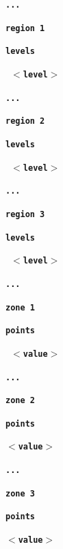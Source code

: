 \documentclass[12pt]{report}
\begin{document}
\textbf{\texttt{...}}

\textbf{\texttt{region 1}}

\textbf{\texttt{levels}}

\textbf{\texttt{ \begin{math}<\end{math}level\begin{math}>\end{math}}}


\textbf{\texttt{...}}

\textbf{\texttt{region 2}}

\textbf{\texttt{levels}}

\textbf{\texttt{ \begin{math}<\end{math}level\begin{math}>\end{math}}}

\textbf{\texttt{...}}

\textbf{\texttt{region 3}}

\textbf{\texttt{levels}}

\textbf{\texttt{ \begin{math}<\end{math}level\begin{math}>\end{math}}}

\textbf{\texttt{...}}

\textbf{\texttt{zone 1}}

\textbf{\texttt{points}}

\textbf{\texttt{ \begin{math}<\end{math}value\begin{math}>\end{math}}}

\textbf{\texttt{...}}

\textbf{\texttt{zone 2}}

\textbf{\texttt{points}}

\textbf{\texttt{\begin{math}<\end{math}value\begin{math}>\end{math}}}

\textbf{\texttt{...}}

\textbf{\texttt{zone 3}}

\textbf{\texttt{points}}

\textbf{\texttt{\begin{math}<\end{math}value\begin{math}>\end{math}}}
\end{document}
